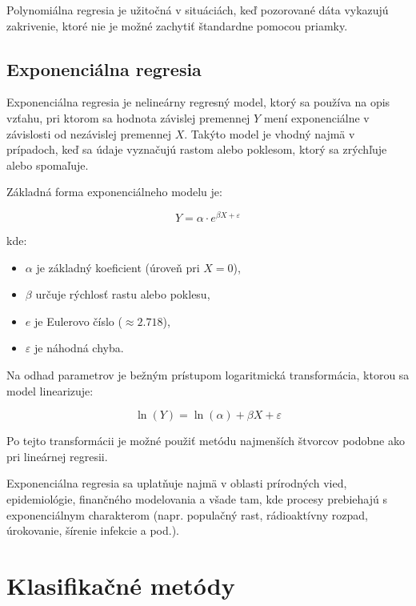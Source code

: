 Polynomiálna regresia je užitočná v situáciách, keď pozorované dáta vykazujú zakrivenie, ktoré nie je možné zachytiť štandardne pomocou priamky.

\subsection{Exponenciálna regresia}
\label{subsec:exponential_regression}

Exponenciálna regresia je nelineárny regresný model, ktorý sa používa na opis vzťahu, pri ktorom sa hodnota závislej premennej $Y$ mení exponenciálne v závislosti od nezávislej premennej $X$. Takýto model je vhodný najmä v prípadoch, keď sa údaje vyznačujú rastom alebo poklesom, ktorý sa zrýchľuje alebo spomaľuje.

Základná forma exponenciálneho modelu je:

\begin{equation}
Y = \alpha \cdot e^{\beta X+\varepsilon}
\end{equation}

kde:
\begin{itemize}
  \item $\alpha$ je základný koeficient (úroveň pri $X=0$),
  \item $\beta$ určuje rýchlosť rastu alebo poklesu,
  \item $e$ je Eulerovo číslo ($\approx 2.718$),
  \item $\varepsilon$ je náhodná chyba.
\end{itemize}

Na odhad parametrov je bežným prístupom logaritmická transformácia, ktorou sa model linearizuje:

\begin{equation}
\ln(Y) = \ln(\alpha) + \beta X + \varepsilon
\end{equation}

Po tejto transformácii je možné použiť metódu najmenších štvorcov podobne ako pri lineárnej regresii.

Exponenciálna regresia sa uplatňuje najmä v oblasti prírodných vied, epidemiológie, finančného modelovania a všade tam, kde procesy prebiehajú s exponenciálnym charakterom (napr. populačný rast, rádioaktívny rozpad, úrokovanie, šírenie infekcie a pod.).

\section{Klasifikačné metódy}\label{sec:classification}

